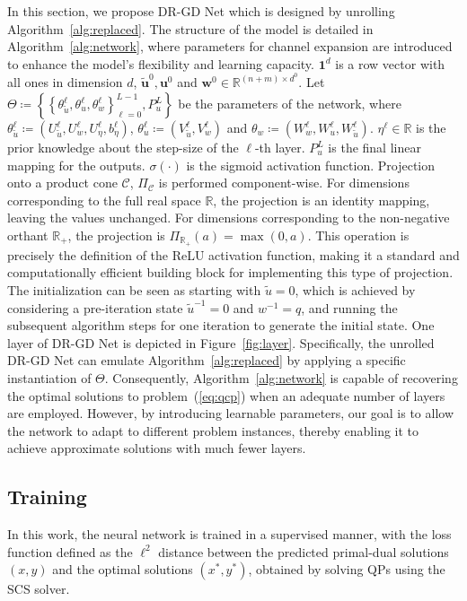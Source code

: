 \documentclass[10pt]{article} %
\begin{document}
In this section, we propose DR-GD Net which is designed by 
unrolling Algorithm~\ref{alg:replaced}.
The structure of the model is detailed in Algorithm~\ref{alg:network}, where parameters for channel expansion are introduced to enhance the model's flexibility and learning capacity.
$\mathbf{1}^d$ is a row vector with all ones in dimension $d$,
$\tilde{\mathbf{u}}^0, \mathbf{u}^0$ and $\mathbf{w}^0 \in \mathbb{R}^{(n+m)\times d^0}$.
Let $\Theta \coloneqq \left\{\left\{\theta_{\tilde{u}}^\ell, \theta_{u}^\ell, \theta_w^\ell\right\}_{\ell=0}^{L-1}, P_u^{L}\right\}$ be the parameters of the network, where $\theta_{\tilde{u}}^\ell \coloneqq \left(U_{\tilde{u}}^\ell, U_w^\ell, U_\eta^\ell, b_\eta^\ell\right)$,
$\theta_{u}^\ell \coloneqq \left(V_{\tilde{u}}^\ell, V_w^\ell\right)$
and $\theta_w \coloneqq \left(W_w^\ell, W_u^\ell, W_{\tilde{u}}^\ell\right)$.
$\eta^\ell\in \mathbb{R}$ is the prior knowledge about the step-size of the $\ell$-th layer.
$P_u^{L}$ is the final linear mapping for the outputs.
$\sigma(\cdot)$ is the sigmoid activation function.
Projection onto a product cone $\mathcal{C}$, $\Pi_\mathcal{C}$ is performed component-wise.
For dimensions corresponding to the full real space $\mathbb{R}$, the projection is an identity mapping, leaving the values unchanged.
For dimensions corresponding to the non-negative orthant $\mathbb{R}_+$, the projection is $\Pi_{\mathbb{R}_+}(a) = \max(0, a)$. 
This operation is precisely the definition of the ReLU activation function, making it a standard and computationally efficient building block for implementing this type of projection.
The initialization can be seen as starting with $\tilde{u}=0$, which is achieved by considering a pre-iteration state $\tilde{u}^{-1} = 0$ and $w^{-1} = q$, and running the subsequent algorithm steps for one iteration to generate the initial state.
One layer of DR-GD Net is depicted in Figure~\ref{fig:layer}.
Specifically, the unrolled DR-GD Net can emulate Algorithm~\ref{alg:replaced} by applying a specific instantiation of $\Theta$.
Consequently, Algorithm~\ref{alg:network} is capable of recovering the optimal solutions to problem~(\ref{eq:qcp}) when an adequate number of layers are employed.
However, by introducing learnable parameters, our goal is to allow the network to adapt to different problem instances, thereby enabling it to achieve approximate solutions with much fewer layers.

\subsection{Training}
\label{sec:training}
In this work, the neural network is trained in a supervised manner, with the loss function defined as the $\ell^2$ distance between the predicted primal-dual solutions $(x, y)$ and the optimal solutions $(x^*, y^*)$, obtained by solving QPs using the SCS solver.
\end{document}
